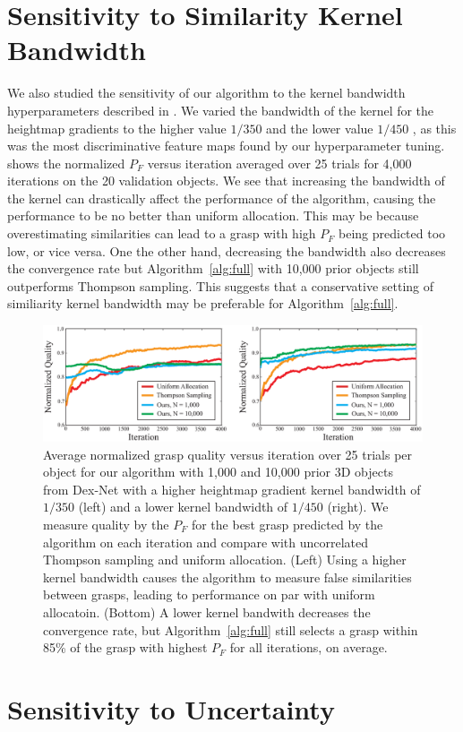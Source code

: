 \section{Sensitivity to Similarity Kernel Bandwidth}
We also studied the sensitivity of our algorithm to the kernel bandwidth hyperparameters described in .
We varied the bandwidth of the kernel for the heightmap gradients to the higher value $1 / 350$ and the lower value $1 / 450$ , as this was the most discriminative feature maps found by our hyperparameter tuning.
 shows the normalized $P_F$ versus iteration averaged over 25 trials for 4,000 iterations on the 20 validation objects.
We see that increasing the bandwidth of the kernel can drastically affect the performance of the algorithm, causing the performance to be no better than uniform allocation.
This may be because overestimating similarities can lead to a grasp with high $P_F$ being predicted too low, or vice versa.
One the other hand, decreasing the bandwidth also decreases the convergence rate but Algorithm~\ref{alg:full} with 10,000 prior objects still outperforms Thompson sampling.
This suggests that a conservative setting of similiarity kernel bandwidth may be preferable for Algorithm~\ref{alg:full}.

\begin{figure}[t!]
\centering
\includegraphics[scale=0.23]{figures/illustrations/weight_sensitivity.eps}
\caption{Average normalized grasp quality versus iteration over 25 trials per object for our algorithm with 1,000 and 10,000 prior 3D objects from Dex-Net with a higher heightmap gradient kernel bandwidth of $1 / 350$ (left) and a lower kernel bandwidth of $1 / 450$ (right). We measure quality by the $P_F$ for the best grasp predicted by the algorithm on each iteration and compare with uncorrelated Thompson sampling and uniform allocation. (Left) Using a higher kernel bandwidth causes the algorithm to measure false similarities between grasps, leading to performance on par with uniform allocatoin. (Bottom) A lower kernel bandwith decreases the convergence rate, but Algorithm~\ref{alg:full} still selects a grasp within 85\% of the grasp with highest $P_F$ for all iterations, on average.}
\vspace*{-15pt}
\end{figure}

\section{Sensitivity to Uncertainty}
